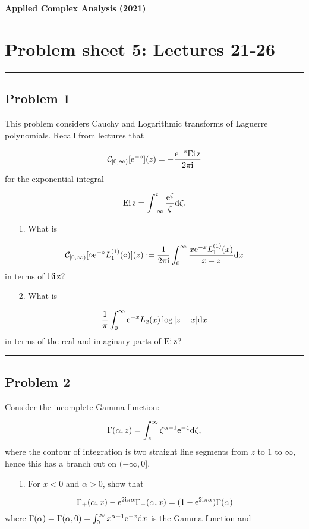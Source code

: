 \documentclass[12pt,a4paper]{article}
\def\D{ {\rm d} }
\def\I{ {\rm i} }
\def\E{ {\rm e} }
\def\CC{ {\cal C} }
\def\Ei{ {\rm Ei}\, }
\def\dx{\D x}
\def\Ei{\rm Ei\,}
\begin{document}
\textbf{Applied Complex Analysis (2021)}

\section{Problem sheet 5: Lectures 21-26}
\rule{\textwidth}{1pt}
\subsection{Problem 1}
This problem considers Cauchy and Logarithmic transforms of Laguerre polynomials. Recall from lectures that

\[
\CC_{[0,\infty)}[\E^{-\diamond}](z) = -{\E^{-z} \Ei z \over 2 \pi \I}
\]
for the exponential integral

\[
\Ei z = \int_{-\infty}^z {\E^\zeta \over \zeta} \D \zeta.
\]
\begin{itemize}
\item[1. ] What is

\end{itemize}
\[
	\CC_{[0,\infty)}[\diamond \E^{-\diamond} L_1^{(1)}(\diamond)](z) := {1 \over 2 \pi \I} \int_0^\infty {x \E^{-x} L_1^{(1)}(x) \over x-z} \dx
\]
in terms of $\Ei z$?

\begin{itemize}
\item[2. ] What is

\end{itemize}
\[
	 {1 \over \pi} \int_0^\infty { \E^{-x} L_2(x) \log|z-x|} \dx
\]
in terms of the real and imaginary parts of $\Ei z$?

\rule{\textwidth}{1pt}
\subsection{Problem 2}
Consider the incomplete Gamma function:

\[
\Gamma(\alpha, z) = \int_z^\infty \zeta^{\alpha-1} \E^{-\zeta} \D\zeta,
\]
where the contour of integration is two straight line segments from $z$ to $1$ to $\infty$, hence this has a branch cut on $(-\infty,0]$.

\begin{itemize}
\item[1. ] For $x < 0$ and $\alpha > 0$, show that

\end{itemize}
\[
\Gamma_+(\alpha,x) -  \E^{2\I \pi \alpha} \Gamma_-(\alpha,x) = (1-\E^{2 \I \pi \alpha}) \Gamma(\alpha)
\]
where $\Gamma(\alpha) = \Gamma(\alpha,0) = \int_0^\infty x^{\alpha-1} \E^{-x} \dx$ is the Gamma function and
\end{document}
